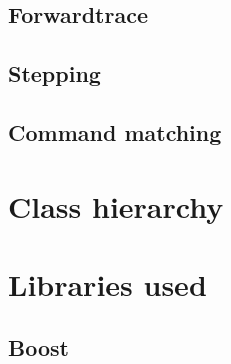 \subsection*{Forwardtrace}

\subsection*{Stepping}

\subsection*{Command matching}

\section{Class hierarchy}


\section{Libraries used}

\subsection*{Boost\cite{boost}}

